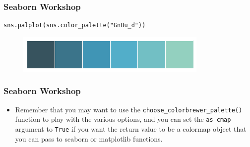 \documentclass{beamer}
\begin{document}
\begin{frame}[fragile]
	\frametitle{Seaborn Workshop}
	\large
	
\begin{verbatim}
sns.palplot(sns.color_palette("GnBu_d"))
\end{verbatim}

\begin{figure}
	\centering
	\includegraphics[width=0.7\linewidth]{images/color_palettes_29_0}
\end{figure}
\end{frame}
\begin{frame}[fragile]
	\frametitle{Seaborn Workshop}
	\large
	\begin{itemize}
\item Remember that you may want to use the \texttt{choose\_colorbrewer\_palette()} function to play with the various options, and you can set the \texttt{as\_cmap} argument to \texttt{True} if you want the return value to be a colormap object that you can pass to seaborn or matplotlib functions.
	\end{itemize}

\end{frame}
\end{document}
